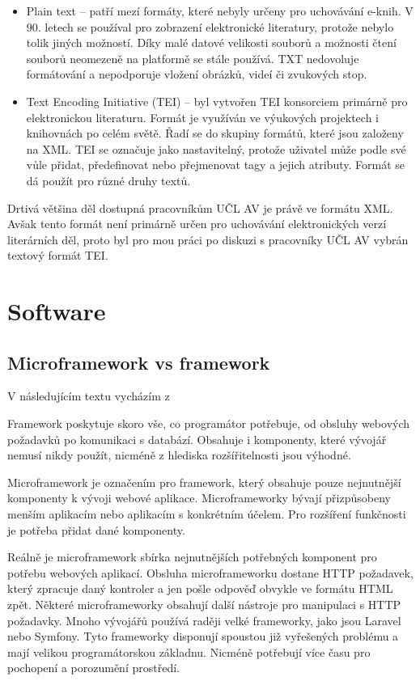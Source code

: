 \begin{itemize}
                \item Plain text – patří mezí formáty, které nebyly určeny pro uchovávání e-knih. V 90. letech se používal pro zobrazení elektronické literatury, protože nebylo tolik jiných možností. Díky malé datové velikosti souborů a možnosti čtení souborů neomezeně na platformě se stále používá. TXT nedovoluje formátování a nepodporuje vložení obrázků, videí či zvukových stop.
                
                \item Text Encoding Initiative (TEI) – byl vytvořen TEI konsorciem primárně pro elektronickou literaturu. Formát je využíván ve výukových projektech i knihovnách po celém světě. Řadí se do skupiny formátů, které jsou založeny na XML. TEI se označuje jako nastavitelný, protože uživatel může podle své vůle přidat, předefinovat nebo přejmenovat tagy a jejich atributy. Formát se dá použít pro různé druhy textů.
            \end{itemize}
            
            Drtivá většina děl dostupná pracovníkům UČL AV je právě ve formátu XML. Avšak tento formát není primárně určen pro uchovávání elektronických verzí literárních děl, proto byl pro mou práci po diskuzi s pracovníky UČL AV vybrán textový formát TEI.
    \section{Software}
        \subsection{Microframework vs framework}
            V následujícím textu vycházím z \cite{microframework-vs-framework}
            
            Framework poskytuje skoro vše, co programátor potřebuje, od obsluhy webových požadavků po komunikaci s databází. Obsahuje i komponenty, které vývojář nemusí nikdy použít, nicméně z hlediska rozšířitelnosti jsou výhodné.
            
            Microframework je označením pro framework, který obsahuje pouze nejnutnější komponenty k vývoji webové aplikace. Microframeworky bývají přizpůsobeny menším aplikacím nebo aplikacím s konkrétním účelem. Pro rozšíření funkčnosti je potřeba přidat dané komponenty.
            
            Reálně je microframework sbírka nejnutnějších potřebných komponent pro potřebu webových aplikací. Obsluha microframeworku dostane HTTP požadavek, který zpracuje daný kontroler a jen pošle odpověď obvykle ve formátu HTML zpět. Některé microframeworky obsahují další nástroje pro manipulaci s HTTP požadavky. Mnoho vývojářů používá raději velké frameworky, jako jsou Laravel nebo Symfony. Tyto frameworky disponují spoustou již vyřešených problému a mají velikou programátorskou základnu. Nicméně potřebují více času pro pochopení a porozumění prostředí. 
            
